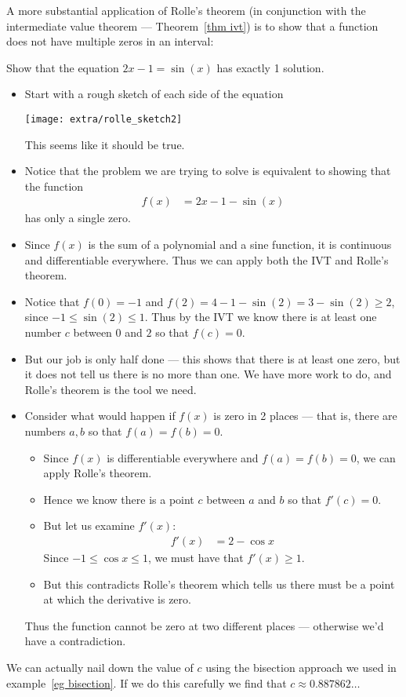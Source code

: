 A more substantial application of Rolle's theorem (in conjunction with the intermediate
value theorem --- Theorem~\ref{thm ivt}) is to show that a function does not have
multiple zeros in an interval:
\begin{eg}\label{eg_2_13_2}
Show that the equation $2x-1=\sin(x)$ has exactly 1 solution.
\begin{itemize}
\item Start with a rough sketch of each side of the equation
\begin{efig}
\begin{center}
 \texttt{[image: extra/rolle\_sketch2]}
\end{center}
\end{efig}
This seems like it should be true.

\item Notice that the problem we are trying to solve is equivalent to showing
that the function
\begin{align*}
  f(x) &= 2x-1-\sin(x)
\end{align*}
has only a single zero.
\item Since $f(x)$ is the sum of a polynomial and a sine function, it is continuous and
differentiable everywhere. Thus we can apply both the IVT and Rolle's theorem.
\item Notice that $f(0)=-1$ and $f(2) = 4-1-\sin(2) = 3-\sin(2) \geq 2$, since $-1\leq
\sin(2) \leq 1$. Thus by the IVT we know there is at least one number $c$ between $0$ and
$2$ so that $f(c)=0$.

\item But our job is only half done --- this shows that there is at least one zero, but
it does not tell us there is no more than one. We have more work to do, and Rolle's
theorem is the tool we need.

\item Consider what would happen if $f(x)$ is zero in 2 places --- that is, there are
numbers $a,b$ so that $f(a)=f(b)=0$.
\begin{itemize}
 \item Since $f(x)$ is differentiable everywhere and $f(a)=f(b)=0$, we can apply Rolle's
theorem.
\item Hence we know there is a point $c$ between $a$ and $b$ so that $f'(c)=0$.
\item But let us examine $f'(x)$:
\begin{align*}
  f'(x) &= 2- \cos x
\end{align*}
Since $-1\leq \cos x \leq 1$, we must have that $f'(x) \geq 1$.
\item But this contradicts Rolle's theorem which tells us there must be a point at which
the derivative is zero.
\end{itemize}
Thus the function cannot be zero at two different places --- otherwise we'd have a
contradiction.
\end{itemize}
We can actually nail down the value of $c$ using the bisection approach we used in
example~\ref{eg bisection}. If we do this carefully we find that $c \approx
0.887862\dots$

\end{eg}



